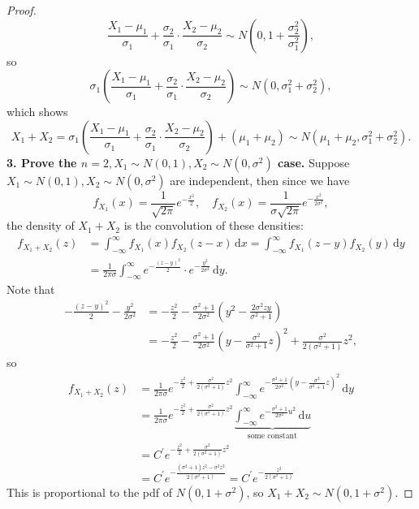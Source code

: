 \begin{proof}
    \[
        \frac{X_1 - \mu_1}{\sigma_1} + \frac{\sigma _2}{\sigma _1} \cdot \frac{X_2 - \mu _2}{\sigma _2} \sim N\left( 0, 1 + \frac{\sigma _2^2}{\sigma _1^2} \right), 
    \]  
    so 
    \[
        \sigma _1 \left( \frac{X_1 - \mu_1}{\sigma_1} + \frac{\sigma _2}{\sigma _1} \cdot \frac{X_2 - \mu _2}{\sigma _2} \right) \sim N(0, \sigma_1^2 + \sigma _2^2), 
    \]
    which shows 
    \[
        X_1 + X_2 = \sigma _1 \left( \frac{X_1 - \mu_1}{\sigma_1} + \frac{\sigma _2}{\sigma _1} \cdot \frac{X_2 - \mu _2}{\sigma _2} \right) + (\mu _1 + \mu _2) \sim N (\mu _1 + \mu _2, \sigma _1^2 + \sigma _2^2). 
    \]
    \textbf{3. Prove the \(n=2, X_1 \sim N(0, 1), X_2 \sim N(0, \sigma ^2) \) case.} Suppose \(X_1 \sim N(0, 1), X_2 \sim N(0, \sigma ^2)\) are independent, then since we have 
    \[
        f_{X_1}(x) = \frac{1}{\sqrt{2 \pi } } e^{- \frac{x^2}{2}}, \quad f_{X_2}(x) = \frac{1}{\sigma \sqrt{2 \pi}} e^{- \frac{x^2}{2 \sigma ^2}},
    \]   
    the density of \(X_1 + X_2\) is the convolution of these densities:
    \begin{align*}
        f_{X_1 + X_2} (z) &= \int _{-\infty }^{\infty } f_{X_1}(x) f_{X_2} (z - x) \, \mathrm{d} x = \int _{-\infty }^{\infty } f_{X_1}(z - y) f_{X_2}(y) \, \mathrm{d} y \\
        &= \frac{1}{2 \pi \sigma } \int _{-\infty }^{\infty} e^{- \frac{(z-y)^2}{2}} \cdot e^{- \frac{y^2}{2 \sigma ^2}} \, \mathrm{d} y.   
    \end{align*}  
    Note that 
    \begin{align*}
        - \frac{(z-y)^2}{2} - \frac{y^2}{2 \sigma ^2} &= - \frac{z^2}{2} - \frac{\sigma ^2 + 1}{2 \sigma ^2} \left( y^2 - \frac{2 \sigma ^2 zy}{\sigma ^2 + 1} \right) \\
        &= - \frac{z^2}{2} - \frac{\sigma ^2 + 1}{2 \sigma ^2} \left( y - \frac{\sigma ^2}{\sigma ^2 + 1} z \right)^2 + \frac{\sigma ^2}{2(\sigma ^2 + 1)} z^2, 
    \end{align*}
    so 
    \begin{align*}
        f_{X_1 + X_2}(z) &= \frac{1}{2 \pi \sigma} e^{-\frac{z^2}{2} + \frac{\sigma ^2}{2(\sigma ^2 + 1)} z^2} \int _{-\infty }^{\infty } e^{-\frac{\sigma ^2 + 1}{2 \sigma ^2} \left( y - \frac{\sigma ^2}{\sigma ^2 + 1} z \right)^2 } \, \mathrm{d} y \\
        &= \frac{1}{2 \pi \sigma} e^{-\frac{z^2}{2} + \frac{\sigma ^2}{2(\sigma ^2 + 1)} z^2} \underbrace{\int _{-\infty }^{\infty } e^{- \frac{\sigma ^2 + 1}{2 \sigma ^2} u^2} \, \mathrm{d} u}_{\text{some constant}} \\
        &= C^{\prime} e^{- \frac{z^2}{2} + \frac{\sigma ^2}{2(\sigma ^2 + 1)} z^2} \\
        &= C^{\prime} e^{- \frac{(\sigma ^2 + 1) z^2 - \sigma ^2 z^2}{2 (\sigma ^2 + 1)}} = C^{\prime} e^{- \frac{z^2}{2(\sigma ^2 + 1)}}
    \end{align*}
    This is proportional to the pdf of \(N(0, 1 + \sigma ^2)\), so \(X_1 + X_2 \sim N(0, 1 + \sigma ^2)\). 
\end{proof}

